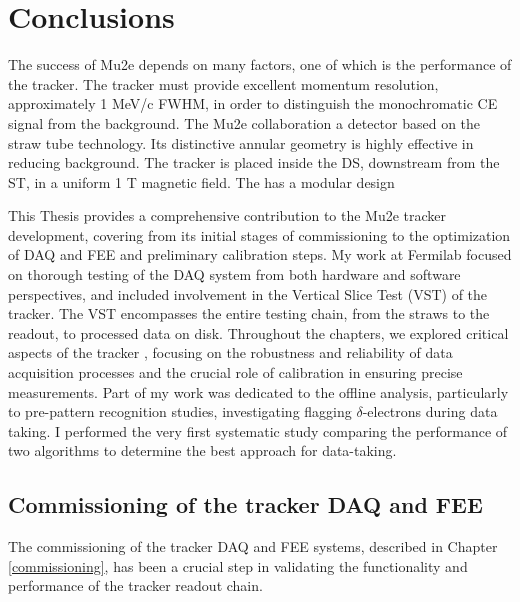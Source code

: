 \chapter{Conclusions}\label{conclusions}
The success of Mu2e depends on many factors, 
one of which is the performance of the tracker. 
The tracker must provide  excellent momentum 
resolution, approximately 1 MeV/c FWHM, 
in order to distinguish the monochromatic CE 
signal from the background. 
The Mu2e collaboration  a detector 
based on the straw tube technology.  
Its distinctive annular geometry is highly 
effective in reducing  background. 
The tracker is placed inside the 
DS, downstream from the ST, 
in a uniform 1 T magnetic field. The   
has a modular design

This Thesis provides a comprehensive 
contribution to the Mu2e tracker 
development, covering from its initial stages of 
commissioning to the optimization 
of DAQ and FEE and preliminary calibration 
steps. My work at Fermilab 
focused on thorough testing of the DAQ system 
from both hardware and 
software perspectives, and included 
involvement in the Vertical Slice Test 
(VST) of the tracker. 
The VST encompasses the entire testing 
chain, from the straws to the readout, 
to processed data on disk.
Throughout the chapters, we explored 
critical aspects of the tracker 
, focusing on the robustness and 
reliability of data acquisition 
processes and the crucial role of 
calibration in ensuring precise measurements. 
Part of my work was dedicated to the offline 
analysis, particularly to pre-pattern recognition 
studies, investigating   
flagging $\delta$-electrons during data taking. 
I performed the very first systematic study 
comparing the performance of two algorithms 
to determine the best approach for data-taking. 
\section{Commissioning of the tracker DAQ and FEE}
The commissioning of the tracker DAQ and FEE 
systems, described in Chapter 
\ref{commissioning}, has been a crucial step 
in validating the functionality 
and performance of the tracker readout chain.

